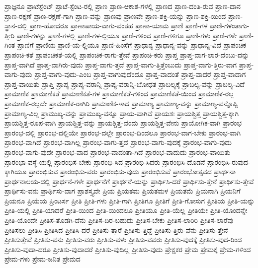 {ಪ್ರಾಜ್ಞನೂ
ಪ್ರಾಟೆಸ್ಟೆಂಟ್
ಪ್ರಾಟೆ-ಸ್ಟೆಂಟ-ರಲ್ಲಿ
ಪ್ರಾಣ
ಪ್ರಾಣ-ಆಕಾಶ-ಗಳಲ್ಲಿ
ಪ್ರಾಣದ
ಪ್ರಾಣ-ದಂತಿ-ರುವ
ಪ್ರಾಣ-ದಾನ
ಪ್ರಾಣ-ರಕ್ಷಣೆ
ಪ್ರಾಣ-ರಕ್ಷಣೆ-ಗಾಗಿ
ಪ್ರಾಣ-ವನ್ನು
ಪ್ರಾಣವು
ಪ್ರಾಣವೇ
ಪ್ರಾಣ-ಶಕ್ತಿ-ಯನ್ನು
ಪ್ರಾಣ-ಶಕ್ತಿ-ಯಿಂದ
ಪ್ರಾಣ-ಸ್ಥಾನ-ದಲ್ಲಿ
ಪ್ರಾಣ-ಹೋದರೂ
ಪ್ರಾಣಾಪಾಯ-ವಾಗು-ವಂತಹ
ಪ್ರಾಣಾ-ಯಾಮ
ಪ್ರಾಣಿ
ಪ್ರಾಣಿ-ಗಳ
ಪ್ರಾಣಿ-ಗಳಂತಾಗು-ತ್ತೀರಿ
ಪ್ರಾಣಿ-ಗಳನ್ನು
ಪ್ರಾಣಿ-ಗಳಲ್ಲಿ
ಪ್ರಾಣಿ-ಗಳ-ಲ್ಲಿಯೂ
ಪ್ರಾಣಿ-ಗಳಿಂದ
ಪ್ರಾಣಿ-ಗಳಿಗೂ
ಪ್ರಾಣಿ-ಗಳು
ಪ್ರಾಣಿ-ಗಳೇ
ಪ್ರಾಣಿ-ಗಿಂತ
ಪ್ರಾಣಿಗೆ
ಪ್ರಾಣಿಯ
ಪ್ರಾಣಿ-ಯ-ಲ್ಲಿಯೂ
ಪ್ರಾಣಿ-ಹಿಂಸೆಗೆ
ಪ್ರಾಧಾನ್ಯ
ಪ್ರಾಧಾನ್ಯ-ವನ್ನು
ಪ್ರಾಧಾನ್ಯ-ವಿದೆ
ಪ್ರಾಪಂಚಿಕ
ಪ್ರಾಪಂಚಿ-ಕತೆ
ಪ್ರಾಪಂಚಿಕತೆ-ಯಲ್ಲಿ
ಪ್ರಾಪಂಚಿಕ-ರಾಗು-ತ್ತೇವೆ
ಪ್ರಾಪಂಚಿ-ಕರು
ಪ್ರಾಪ್ತ
ಪ್ರಾಪ್ತ-ವಾಗ-ಲಾರ-ದೆಂಬು-ದನ್ನು
ಪ್ರಾಪ್ತ-ವಾಗಿದೆ
ಪ್ರಾಪ್ತ-ವಾಗಿರು-ವುದು
ಪ್ರಾಪ್ತ-ವಾಗು-ತ್ತದೆ
ಪ್ರಾಪ್ತ-ವಾಗು-ತ್ತಿತ್ತೆಂಬುದು
ಪ್ರಾಪ್ತ-ವಾಗು-ತ್ತಿರು-ವಾಗ
ಪ್ರಾಪ್ತ-ವಾಗು-ವುದು
ಪ್ರಾಪ್ತ-ವಾಗು-ವುದು-ಎಂಬ
ಪ್ರಾಪ್ತ-ವಾಗುವುದೆಂದೂ
ಪ್ರಾಪ್ತ-ವಾದಂತೆ
ಪ್ರಾಪ್ತ-ವಾದರೆ
ಪ್ರಾಪ್ತ-ವಾದಾಗ
ಪ್ರಾಪ್ತ-ವಾಯಿತು
ಪ್ರಾಪ್ತಿ
ಪ್ರಾಪ್ಯ
ಪ್ರಾಪ್ಯ-ವರಾನ್ನಿ
ಪ್ರಾಪ್ಯ-ವರಾನ್ನಿ-ಬೋಧತ
ಪ್ರಾಬಲ್ಯಕ್ಕೆ
ಪ್ರಾಬಲ್ಯ-ವನ್ನು
ಪ್ರಾಬಲ್ಯ-ವಿದೆ
ಪ್ರಾಮಾಣಿಕ
ಪ್ರಾಮಾಣಿಕತೆ
ಪ್ರಾಮಾಣಿಕತೆ-ಗಳ
ಪ್ರಾಮಾಣಿಕತೆ-ಗಳಿಂದ
ಪ್ರಾಮಾಣಿಕತೆ-ಯಿಂದ
ಪ್ರಾಮಾಣಿಕ-ರಲ್ಲ
ಪ್ರಾಮಾಣಿಕ-ರಲ್ಲದೇ
ಪ್ರಾಮಾಣಿಕ-ರಾಗಿರಿ
ಪ್ರಾಮಾಣಿಕ-ಳಾದ
ಪ್ರಾಮಾಣ್ಯ
ಪ್ರಾಮಾಣ್ಯ-ವನ್ನು
ಪ್ರಾಮಾಣ್ಯ-ವನ್ನೊಪ್ಪಿ
ಪ್ರಾಮಾಣ್ಯ-ವಿಲ್ಲ
ಪ್ರಾಮುಖ್ಯ-ವನ್ನು
ಪ್ರಾಮುಖ್ಯ-ವನ್ನೂ
ಪ್ರಾಯ-ವಾಗಿವೆ
ಪ್ರಾಯಶಃ
ಪ್ರಾಯಶ್ಚಿತ್ತ
ಪ್ರಾಯಶ್ಚಿತ್ತ-ಕ್ಕಾಗಿ
ಪ್ರಾಯಶ್ಚಿತ್ತ-ರೂಪ-ವಾಗಿ
ಪ್ರಾಯಶ್ಚಿತ್ತ-ವನ್ನು
ಪ್ರಾಯಶ್ಚಿತ್ತ-ವೆಂದು
ಪ್ರಾಯಶ್ಚಿತ್ತ-ವೇನು
ಪ್ರಾಯೋಗಿಕ-ವಾಗಿ
ಪ್ರಾರಂಭ
ಪ್ರಾರಂಭ-ದಲ್ಲಿ
ಪ್ರಾರಂಭ-ದಲ್ಲಿಯೇ
ಪ್ರಾರಂಭ-ದಲ್ಲೇ
ಪ್ರಾರಂಭ-ದಿಂದಲೂ
ಪ್ರಾರಂಭ-ವಾಗ-ಬೇಕು
ಪ್ರಾರಂಭ-ವಾಗಿ
ಪ್ರಾರಂಭ-ವಾಗಿದೆ
ಪ್ರಾರಂಭ-ವಾಗಿಲ್ಲ
ಪ್ರಾರಂಭ-ವಾಗು-ತ್ತದೆ
ಪ್ರಾರಂಭ-ವಾಗು-ವುದಕ್ಕೆ
ಪ್ರಾರಂಭ-ವಾಗು-ವುದು
ಪ್ರಾರಂಭ-ವಾಗು-ವುದೇ
ಪ್ರಾರಂಭ-ವಾದ
ಪ್ರಾರಂಭ-ವಾದಂತಾ-ಗಿದೆ
ಪ್ರಾರಂಭ-ವಾದುದು
ಪ್ರಾರಂಭ-ವಾಯಿತು
ಪ್ರಾರಂಭಾ-ವಸ್ಥೆ-ಯಲ್ಲಿ
ಪ್ರಾರಂಭಿಸ-ಬೇಕು
ಪ್ರಾರಂಭಿ-ಸಿದ
ಪ್ರಾರಂಭಿ-ಸಿದರು
ಪ್ರಾರಂಭಿಸಿ-ದೊಡನೆ
ಪ್ರಾರಂಭಿಸಿ-ರುವುದ-ಕ್ಕಾಗಿಯೂ
ಪ್ರಾರಂಭಿಸುವ
ಪ್ರಾರಂಭಿಸು-ವರು
ಪ್ರಾರಂಭಿಸು-ವುದು
ಪ್ರಾರಂಭಿಸುವೆ
ಪ್ರಾರಂಭೋತ್ಸವದ
ಪ್ರಾರ್ಥನಾ
ಪ್ರಾರ್ಥನಾಲಯ-ದಲ್ಲಿ
ಪ್ರಾರ್ಥನೆ-ಗಳೇ
ಪ್ರಾರ್ಥನೆಗೆ
ಪ್ರಾರ್ಥನೆ-ಯನ್ನು
ಪ್ರಾರ್ಥಿಸಿ-ದರೆ
ಪ್ರಾರ್ಥಿಸು-ತ್ತೇನೆ
ಪ್ರಾರ್ಥಿಸು-ತ್ತೇವೆ
ಪ್ರಾರ್ಥಿಸು-ವನು
ಪ್ರಾರ್ಥಿಸು-ವಾಗ
ಪ್ರಾಶಸ್ತ್ಯವೇ
ಪ್ರಿಯ
ಪ್ರಿಯತಮ
ಪ್ರಿಯತಮಳ
ಪ್ರಿಯತಮೆ
ಪ್ರಿಯನಾಗಿ
ಪ್ರಿಯನಿಗೆ
ಪ್ರಿಯನೂ
ಪ್ರಿಯೆಯ
ಪ್ರಿಂಟರ್ಸ
ಪ್ರೀತಿ
ಪ್ರೀತಿ-ಗಳು
ಪ್ರೀತಿ-ಗಾಗಿ
ಪ್ರೀತಿಗೂ
ಪ್ರೀತಿಗೆ
ಪ್ರೀತಿ-ಗೋಸುಗ
ಪ್ರೀತಿಯ
ಪ್ರೀತಿ-ಯನ್ನು
ಪ್ರೀತಿ-ಯಲ್ಲಿ
ಪ್ರೀತಿ-ಯಾದರೆ
ಪ್ರೀತಿ-ಯಿಂದ
ಪ್ರೀತಿ-ಯಿಂದಲೂ
ಪ್ರೀತಿಯೂ
ಪ್ರೀತಿ-ಯೆಲ್ಲ
ಪ್ರೀತಿಯೇ
ಪ್ರೀತಿ-ಯೊಂದನ್ನೇ
ಪ್ರೀತಿ-ಯೊಂದೇ
ಪ್ರೀತಿಸ-ತೊಡಗಿ-ದೆನು
ಪ್ರೀತಿಸ-ದಿರ-ಬಹುದು
ಪ್ರೀತಿಸ-ಬೇಕು
ಪ್ರೀತಿಸ-ಲಾರಿರಿ
ಪ್ರೀತಿಸ-ಲಾರೆವು
ಪ್ರೀತಿಸಲು
ಪ್ರೀತಿಸಿ
ಪ್ರೀತಿಸಿದ
ಪ್ರೀತಿಸಿ-ದರೆ
ಪ್ರೀತಿಸು-ತ್ತಾರೆ
ಪ್ರೀತಿಸು-ತ್ತಿದ್ದೆ
ಪ್ರೀತಿಸು-ತ್ತಿರು-ವೆನು
ಪ್ರೀತಿಸು-ತ್ತೇನೆ
ಪ್ರೀತಿಸುತ್ತೇವೆ
ಪ್ರೀತಿಸು-ವನು
ಪ್ರೀತಿಸು-ವರು
ಪ್ರೀತಿಸು-ವಳು
ಪ್ರೀತಿಸು-ವವರು
ಪ್ರೀತಿಸು-ವುದಕ್ಕೆ
ಪ್ರೀತಿಸು-ವುದ-ರಿಂದ
ಪ್ರೀತಿಸು-ವುದಾ-ದರೂ
ಪ್ರೀತಿಸು-ವುದಾದರೆ
ಪ್ರೀತಿಸು-ವುದಿಲ್ಲ
ಪ್ರೀತಿಸು-ವುದು
ಪ್ರೇಕ್ಷಕರ
ಪ್ರೇಮ
ಪ್ರೇಮಕ್ಕೆ
ಪ್ರೇಮ-ಗಳಿಂದ
ಪ್ರೇಮ-ಗಳು
ಪ್ರೇಮ-ಜನಿತ
ಪ್ರೇಮದ
}
